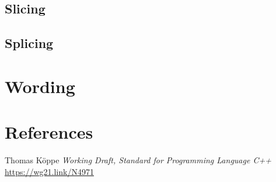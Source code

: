 \documentclass{wg21}
\begin{document}
\subsection{Slicing}

\subsection{Splicing}

\section{Wording}

\section{References}

\renewcommand{\section}[2]{}%



\begin{thebibliography}{9}

Thomas Köppe
\emph{Working Draft, Standard for Programming Language C++}\newline
\url{https://wg21.link/N4971}


\end{thebibliography}
\end{document}
